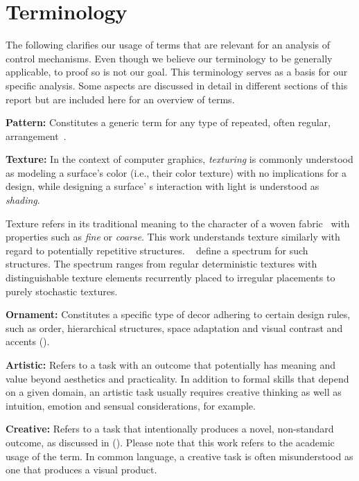 
\section{Terminology}\label{terminology}
The following clarifies our usage of terms that are relevant for an analysis of control mechanisms. Even though we believe our terminology to be generally applicable, to proof so is not our goal. This terminology serves as a basis for our specific analysis. Some aspects are discussed in detail in different sections of this report but are included here for an overview of terms.

\textbf{Pattern:} Constitutes a generic term for any type of repeated, often regular, arrangement~\cite{oed_2017}.

\textbf{Texture:} \label{par:taxo_terminology_texture}In the context of computer graphics, \textit{texturing} is commonly understood as modeling a surface's color (i.e., their color texture) with no implications for a design, while designing a surface' s interaction with light is understood as \textit{shading}. 

Texture refers in its traditional meaning to the character of a woven fabric~\cite{oed_2017} with properties such as \textit{fine} or \textit{coarse}. This work understands texture similarly with regard to potentially repetitive structures. \citeauthor*{lin_2006_qeo}~\cite{lin_2006_qeo} define a spectrum for such structures. The spectrum ranges from regular deterministic textures with distinguishable texture elements recurrently placed to irregular placements to purely stochastic textures.


\textbf{Ornament:} Constitutes a specific type of decor adhering to certain design rules, such as order, hierarchical structures, space adaptation and visual contrast and accents ().

\textbf{Artistic:} Refers to a task with an outcome that potentially has meaning and value beyond aesthetics and practicality. In addition to formal skills that depend on a given domain, an artistic task usually requires creative thinking as well as intuition, emotion and sensual considerations, for example.

\textbf{Creative:} Refers to a task that intentionally produces a novel, non-standard outcome, as discussed in (). Please note that this work refers to the academic usage of the term. In common language, a creative task is often misunderstood as one that produces a visual product.


